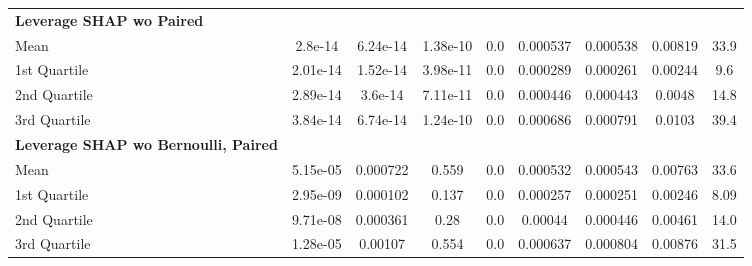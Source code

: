 {\begin{tabular} {lcccccccc}
\addlinespace[1ex] 
\textbf{Leverage SHAP wo Paired} &  &  &  &  &  &  &  &  \\ 
\hspace{7pt}Mean & \cellcolor{gold!60}2.8e-14 & \cellcolor{silver!60}6.24e-14 & \cellcolor{silver!60}1.38e-10 & \cellcolor{gold!60}0.0 & 0.000537 & 0.000538 & 0.00819 & 33.9 \\ 
\hspace{7pt}1st Quartile & \cellcolor{silver!60}2.01e-14 & \cellcolor{silver!60}1.52e-14 & \cellcolor{gold!60}3.98e-11 & \cellcolor{gold!60}0.0 & 0.000289 & 0.000261 & 0.00244 & 9.6 \\ 
\hspace{7pt}2nd Quartile & \cellcolor{gold!60}2.89e-14 & \cellcolor{bronze!60}3.6e-14 & \cellcolor{gold!60}7.11e-11 & \cellcolor{gold!60}0.0 & 0.000446 & 0.000443 & 0.0048 & 14.8 \\ 
\hspace{7pt}3rd Quartile & \cellcolor{gold!60}3.84e-14 & \cellcolor{bronze!60}6.74e-14 & \cellcolor{bronze!60}1.24e-10 & \cellcolor{gold!60}0.0 & 0.000686 & 0.000791 & 0.0103 & 39.4 \\ 
\addlinespace[1ex] 
\textbf{Leverage SHAP wo Bernoulli, Paired} &  &  &  &  &  &  &  &  \\ 
\hspace{7pt}Mean & 5.15e-05 & 0.000722 & 0.559 & \cellcolor{gold!60}0.0 & 0.000532 & 0.000543 & 0.00763 & 33.6 \\ 
\hspace{7pt}1st Quartile & 2.95e-09 & 0.000102 & 0.137 & \cellcolor{gold!60}0.0 & 0.000257 & 0.000251 & 0.00246 & 8.09 \\ 
\hspace{7pt}2nd Quartile & 9.71e-08 & 0.000361 & 0.28 & \cellcolor{gold!60}0.0 & 0.00044 & 0.000446 & 0.00461 & 14.0 \\ 
\hspace{7pt}3rd Quartile & 1.28e-05 & 0.00107 & 0.554 & \cellcolor{gold!60}0.0 & 0.000637 & 0.000804 & 0.00876 & 31.5 \\ 
\bottomrule
\end{tabular}}